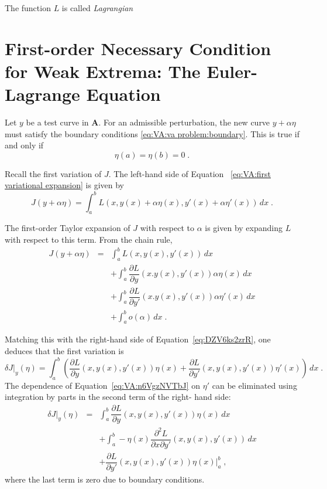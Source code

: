 The function $L$ is called \emph{Lagrangian}

\section{First-order Necessary Condition for Weak Extrema: The Euler-
Lagrange Equation}

Let $y$ be a test curve in $\mathbf{A}$. For an admissible perturbation,
the new curve $y+\alpha\eta$ must satisfy the boundary conditions 
\eqref{eq:VA:va problem:boundary}. This is true if and only if
\[\eta(a)=\eta(b)=0\;.\]

Recall the first variation of $J$. The left-hand side of Equation~
\eqref{eq:VA:first variational expansion} is given by
\begin{equation}\label{eq:DZV6ks2zrR}
J(y+\alpha\eta)=\int_a^bL(x, y(x)+\alpha\eta(x),y'(x)+\alpha\eta'(x))
\,dx\;.
\end{equation}

The first-order Taylor expansion of $J$ with respect to $\alpha$ is 
given by expanding $L$ with respect to this term. From the chain rule,
\begin{equation*}
	\begin{array}{rcl}
		J(y+\alpha\eta)&=&\displaystyle\int_a^b L(x, y(x), y'(x))\,dx\\
		&&+\displaystyle\int_a^b\dfrac{\partial L}{\partial y}(x. y(x),y'(x))\alpha\eta(x)\,dx\\
		&&+\displaystyle\int_a^b\dfrac{\partial L}{\partial y'}(x. y(x),y'(x))\alpha\eta'(x)\,dx\\
		&&+\displaystyle\int_a^b o(\alpha)\,dx\;.
	\end{array}
\end{equation*}

Matching this with the right-hand side of Equation~\eqref{eq:DZV6ks2zrR},
one deduces that the first variation is
\begin{equation}\label{eq:VA:n6VgzNVTbJ}
	\delta J|_y(\eta)=\int_a^b\left(\dfrac{\partial L}{\partial y}(x,
	y(x),y'(x))\eta(x) + \dfrac{\partial L}{\partial y'}(x,
	y(x),y'(x))\eta'(x)\right)\, dx\;.
\end{equation}
The dependence of Equation~\eqref{eq:VA:n6VgzNVTbJ} on $\eta'$ can be
eliminated using integration by parts in the second term of the right-
hand side:
\begin{equation}
	\begin{array}{rcl}
	\delta J|_y(\eta)&=&\displaystyle\int_a^b\dfrac{\partial L}{\partial y}(x,
	y(x),y'(x))\eta(x)\,dx\\
	&&+\displaystyle\int_a^b - \eta(x)\dfrac{\partial^2 L}{\partial x\partial y'}(x,
	y(x),y'(x))\, dx\\
	&&+\dfrac{\partial L}{\partial y'}(x, y(x), y'(x))\eta(x)|_a^b\;,
	\end{array}
\end{equation}
where the last term is zero due to boundary conditions.

